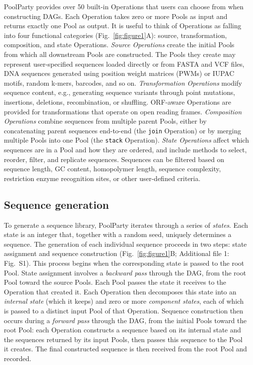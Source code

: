 \documentclass[pdflatex,sn-vancouver-num,referee,oneside]{sn-jnl}
\begin{document}
PoolParty provides over 50 built-in Operations that users can choose from when constructing DAGs. Each Operation takes zero or more Pools as input and returns exactly one Pool as output. It is useful to think of Operations as falling into four functional categories (Fig.~\ref{fig:figure1}A): source, transformation, composition, and state Operations. \emph{Source Operations} create the initial Pools from which all downstream Pools are constructed. The Pools they create may represent user-specified sequences loaded directly or from FASTA and VCF files, DNA sequences generated using position weight matrices (PWMs) or IUPAC motifs, random k-mers, barcodes, and so on. \emph{Transformation Operations} modify sequence content, e.g., generating sequence variants through point mutations, insertions, deletions, recombination, or shuffling. ORF-aware Operations are provided for transformations that operate on open reading frames. \emph{Composition Operations} combine sequences from multiple parent Pools, either by concatenating parent sequences end-to-end (the \texttt{join} Operation) or by merging multiple Pools into one Pool (the \texttt{stack} Operation). \emph{State Operations} affect which sequences are in a Pool and how they are ordered, and include methods to select, reorder, filter, and replicate sequences. Sequences can be filtered based on sequence length, GC content, homopolymer length, sequence complexity, restriction enzyme recognition sites, or other user-defined criteria.

\subsection*{Sequence generation}\label{subsec:sequence-generation}

To generate a sequence library, PoolParty iterates through a series of \emph{states}. Each state is an integer that, together with a random seed, uniquely determines a sequence. The generation of each individual sequence proceeds in two steps: state assignment and sequence construction (Fig.~\ref{fig:figure1}B; Additional file 1: Fig.~S1). This process begins when the corresponding state is passed to the root Pool. State assignment involves a \emph{backward pass} through the DAG, from the root Pool toward the source Pools. Each Pool passes the state it receives to the Operation that created it. Each Operation then decomposes this state into an \emph{internal state} (which it keeps) and zero or more \emph{component states}, each of which is passed to a distinct input Pool of that Operation. Sequence construction then occurs during a \emph{forward pass} through the DAG, from the initial Pools toward the root Pool: each Operation constructs a sequence based on its internal state and the sequences returned by its input Pools, then passes this sequence to the Pool it creates. The final constructed sequence is then received from the root Pool and recorded.
\end{document}
